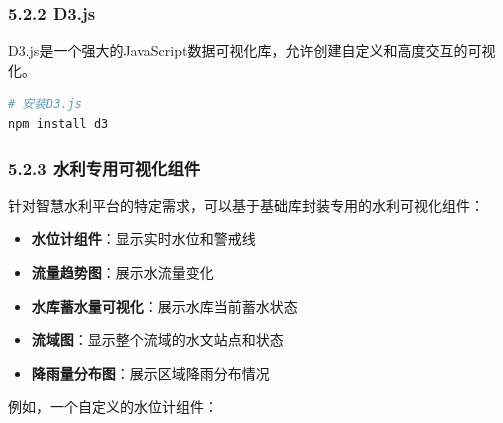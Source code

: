 \subsubsection{5.2.2 D3.js}\label{d3.js}

D3.js是一个强大的JavaScript数据可视化库，允许创建自定义和高度交互的可视化。

\begin{lstlisting}[language=bash]
# 安装D3.js
npm install d3
\end{lstlisting}

\subsubsection{5.2.3
水利专用可视化组件}\label{ux6c34ux5229ux4e13ux7528ux53efux89c6ux5316ux7ec4ux4ef6}

针对智慧水利平台的特定需求，可以基于基础库封装专用的水利可视化组件：

\begin{itemize}
\tightlist
\item
  \textbf{水位计组件}：显示实时水位和警戒线
\item
  \textbf{流量趋势图}：展示水流量变化
\item
  \textbf{水库蓄水量可视化}：展示水库当前蓄水状态
\item
  \textbf{流域图}：显示整个流域的水文站点和状态
\item
  \textbf{降雨量分布图}：展示区域降雨分布情况
\end{itemize}

例如，一个自定义的水位计组件：

